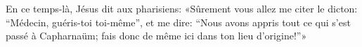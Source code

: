 En ce temps-là, Jésus dit aux pharisiens:
	«Sûrement vous allez me citer le dicton: “Médecin, guéris-toi toi-même”,
	et me dire: “Nous avons appris tout ce qui s’est passé à Capharnaüm;
	fais donc de même ici dans ton lieu d’origine!”»

